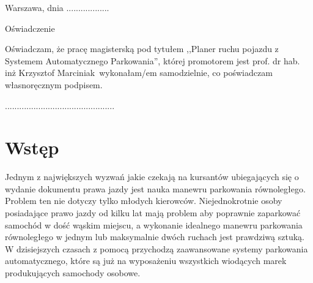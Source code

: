 \documentclass[a4paper,11pt,twoside]{report}
\theoremstyle{definition}
\newcommand{\tytul}{Planer ruchu pojazdu z Systemem Automatycznego Parkowania}
\renewcommand{\title}{Vehicle path planner with Automatic Parking System}
\newcommand{\type}{magisters} %
\newcommand{\supervisor}{prof. dr hab. inż Krzysztof Marciniak}
\begin{document}
\null\thispagestyle{empty}\newpage

\null \hfill Warszawa, dnia ..................\\

\par\vspace{5cm}

\begin{center}
Oświadczenie %
\end{center}

\indent Oświadczam, że pracę \type ką pod
tytułem ,,\tytul '', której promotorem jest \supervisor \ wykonałam/em
samodzielnie, co poświadczam własnoręcznym podpisem.
\vspace{2cm}



\begin{flushright}
  \begin{minipage}{50mm}
    \begin{center}
      ..............................................

    \end{center}
  \end{minipage}
\end{flushright}

\thispagestyle{empty}
\newpage

\null\thispagestyle{empty}\newpage

\tableofcontents
\thispagestyle{empty}
\newpage
\null\thispagestyle{empty}\newpage
\setcounter{page}{11}
\pagestyle{fancy}


\chapter*{Wstęp} %

Jednym z największych wyzwań jakie czekają na kursantów ubiegających się o wydanie dokumentu prawa jazdy jest nauka manewru parkowania równoległego. Problem  ten nie dotyczy tylko młodych kierowców. Niejednokrotnie osoby posiadające prawo jazdy od kilku lat mają problem aby poprawnie zaparkować samochód w dość wąskim miejscu, a wykonanie idealnego manewru parkowania równoległego w jednym lub maksymalnie dwóch ruchach jest prawdziwą sztuką. W dzisiejszych czasach z pomocą przychodzą zaawansowane systemy parkowania automatycznego, które są już na wyposażeniu wszystkich wiodących marek produkujących samochody osobowe. 
\end{document}

